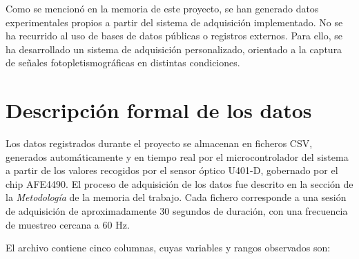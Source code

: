 Como se mencionó en la memoria de este proyecto, se han generado datos experimentales propios a partir del sistema de adquisición implementado. No se ha recurrido al uso de bases de datos públicas o registros externos. Para ello, se ha desarrollado un sistema de adquisición personalizado, orientado a la captura de señales fotopletismográficas en distintas condiciones.

\section{Descripción formal de los datos}

Los datos registrados durante el proyecto se almacenan en ficheros CSV, generados automáticamente y en tiempo real por el microcontrolador del sistema a partir de los valores recogidos por el sensor óptico U401-D, gobernado por el chip AFE4490. El proceso de adquisición de los datos fue descrito en la sección de la \textit{Metodología} de la memoria del trabajo.
Cada fichero corresponde a una sesión de adquisición de aproximadamente 30 segundos de duración, con una frecuencia de muestreo cercana a 60 Hz.

El archivo contiene cinco columnas, cuyas variables y rangos observados son:

